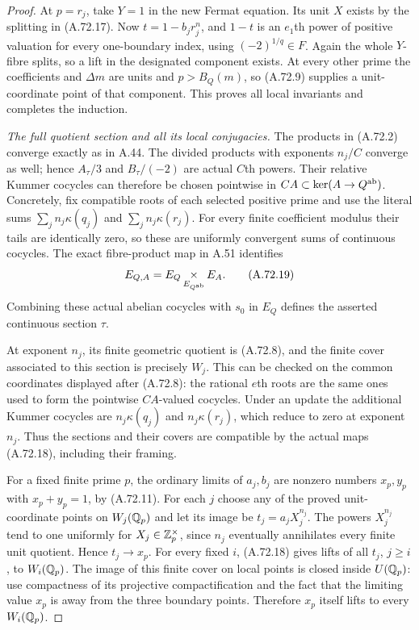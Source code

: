 \begin{proof}
At $p=r_j$, take $Y=1$ in the new Fermat equation.
Its unit $X$ exists by the splitting in (A.72.17).
Now $t=1-b_jr_j^n$, and $1-t$ is an $e_1$th power of positive
valuation for every one-boundary index, using $(-2)^{1/q}\in F$.
Again the whole $Y$-fibre splits, so a lift in the designated
component exists.  At every other prime the coefficients and
$\Delta m$ are units and $p>B_Q(m)$, so (A.72.9) supplies a
unit-coordinate point of that component.
This proves all local invariants and completes the induction.

\emph{The full quotient section and all its local conjugacies.}
The products in (A.72.2) converge exactly as in A.44.
The divided products with exponents $n_j/C$ converge as well;
hence $A_\tau/3$ and $B_\tau/(-2)$ are actual $C$th powers.
Their relative Kummer cocycles can therefore be chosen pointwise
in $CA\subset\ker(A\to Q^{\rm ab})$.  Concretely, fix compatible
roots of each selected positive prime and use the literal sums
$\sum_j n_j\kappa(q_j)$ and $\sum_j n_j\kappa(r_j)$.
For every finite coefficient modulus their tails are identically zero,
so these are uniformly convergent sums of continuous cocycles.
The exact fibre-product map in A.51 identifies
\[
 E_{Q,A}=E_Q\mathop{\times}_{E_{Q^{\rm ab}}}E_A.
\tag{A.72.19}
\]
Combining these actual abelian cocycles with $s_0$ in $E_Q$
defines the asserted continuous section $\tau$.

At exponent $n_j$, its finite geometric quotient is (A.72.8),
and the finite cover associated to this section is precisely
$W_j$.  This can be checked on the common coordinates displayed
after (A.72.8): the rational $e$th roots are the same ones used
to form the pointwise $CA$-valued cocycles.
Under an update the additional Kummer cocycles are
$n_j\kappa(q_j)$ and $n_j\kappa(r_j)$, which reduce to zero
at exponent $n_j$.  Thus the sections and their covers are
compatible by the actual maps (A.72.18), including their framing.

For a fixed finite prime $p$, the ordinary limits of $a_j,b_j$
are nonzero numbers $x_p,y_p$ with $x_p+y_p=1$, by (A.72.11).
For each $j$ choose any of the proved unit-coordinate points on
$W_j(\mathbb Q_p)$ and let its image be $t_j=a_jX_j^{n_j}$.
The powers $X_j^{n_j}$ tend to one uniformly for
$X_j\in\mathbb Z_p^\times$, since $n_j$ eventually annihilates every
finite unit quotient.  Hence $t_j\to x_p$.
For every fixed $i$, (A.72.18) gives lifts of all $t_j$, $j\ge i$,
to $W_i(\mathbb Q_p)$.  The image of this finite cover on local points
is closed inside $U(\mathbb Q_p)$: use compactness of its projective
compactification and the fact that the limiting value $x_p$ is
away from the three boundary points.  Therefore $x_p$ itself
lifts to every $W_i(\mathbb Q_p)$.


\end{proof}
